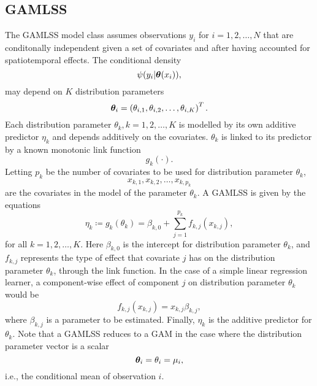 \subsection{GAMLSS}\label{subsec:GAMLSS}
The GAMLSS model class assumes observations $y_i$ for $i=1,2,\ldots,N$ that are conditonally independent given a set of covariates and after having accounted for spatiotemporal effects.
The conditional density
\begin{equation}\label{gamlss-density}
    \psi(y_i|\boldsymbol{\theta}(x_i)),
\end{equation}
may depend on $K$ distribution parameters
\begin{equation*}
    \boldsymbol{\theta}_i=\left(\theta_{i,1},\theta_{i,2},\ldots,\theta_{i,K}\right)^T.
\end{equation*}
Each distribution parameter $\theta_k,k=1,2,\ldots,K$ is modelled by its own additive predictor $\eta_{k}$ and depends additively
on the covariates.
$\theta_k$ is linked to its predictor by a known monotonic link function
\begin{equation*}
    g_k(\cdot).
\end{equation*}
Letting $p_k$ be the number of covariates to be used for distribution parameter $\theta_k$,
\begin{equation*}
    x_{k,1},x_{k,2},\ldots,x_{k,p_k}
\end{equation*}
are the covariates in the model of the parameter $\theta_k$.
A GAMLSS is given by the equations
\begin{equation*}
    \eta_k\coloneqq g_k(\theta_k)=\beta_{k,0}+\sum_{j=1}^{p_k}f_{k,j}(x_{k,j}),
\end{equation*}
for all $k=1,2,\ldots,K$. Here $\beta_{k,0}$ is the intercept for distribution parameter $\theta_k$, and $f_{k,j}$ represents the type of effect that covariate $j$ has on the distribution parameter $\theta_k$, through the link function.
In the case of a simple linear regression learner, a component-wise effect of component $j$ on distribution parameter $\theta_k$ would be
\begin{equation*}
    f_{k,j}(x_{k,j})=x_{k,j}\beta_{k,j},
\end{equation*}
where $\beta_{k,j}$ is a parameter to be estimated.
Finally, $\eta_{k}$ is the additive predictor for $\theta_k$.
Note that a GAMLSS reduces to a GAM \citep{gam-book} in the case where the distribution parameter vector is a scalar
\begin{equation*}
    \boldsymbol{\theta}_i=\theta_i=\mu_i,
\end{equation*}
i.e., the conditional mean of observation $i$.
